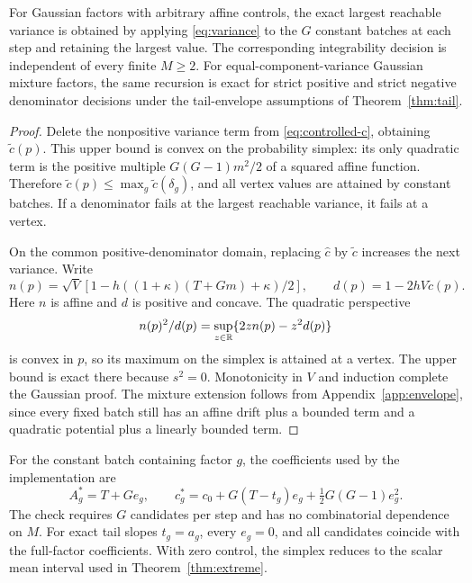 \begin{proposition}\label{prop:control}
For Gaussian factors with arbitrary affine controls, the exact largest reachable variance is obtained by applying \eqref{eq:variance} to the $G$ constant batches at each step and retaining the largest value. The corresponding integrability decision is independent of every finite $M\ge2$. For equal-component-variance Gaussian mixture factors, the same recursion is exact for strict positive and strict negative denominator decisions under the tail-envelope assumptions of Theorem~\ref{thm:tail}.
\end{proposition}
\begin{proof}
Delete the nonpositive variance term from \eqref{eq:controlled-c}, obtaining $\widetilde c(p)$. This upper bound is convex on the probability simplex: its only quadratic term is the positive multiple $G(G-1)m^2/2$ of a squared affine function. Therefore $\widetilde c(p)\le\max_g\widetilde c(\delta_g)$, and all vertex values are attained by constant batches. If a denominator fails at the largest reachable variance, it fails at a vertex.

On the common positive-denominator domain, replacing $\widehat c$ by $\widetilde c$ increases the next variance. Write
\[
 n(p)=\sqrt V[1-h((1+\kappa)(T+Gm)+\kappa)/2],\qquad
 d(p)=1-2hV\widetilde c(p).
\]
Here $n$ is affine and $d$ is positive and concave. The quadratic perspective
\[
 n(p)^2/d(p)=\sup_{z\in\mathbb R}\{2zn(p)-z^2d(p)\}
\]
is convex in $p$, so its maximum on the simplex is attained at a vertex. The upper bound is exact there because $s^2=0$. Monotonicity in $V$ and induction complete the Gaussian proof. The mixture extension follows from Appendix~\ref{app:envelope}, since every fixed batch still has an affine drift plus a bounded term and a quadratic potential plus a linearly bounded term.
\end{proof}

For the constant batch containing factor $g$, the coefficients used by the implementation are
\[
 A_g^*=T+Ge_g,\qquad c_g^*=c_0+G(T-t_g)e_g+\tfrac12G(G-1)e_g^2.
\]
The check requires $G$ candidates per step and has no combinatorial dependence on $M$. For exact tail slopes $t_g=a_g$, every $e_g=0$, and all candidates coincide with the full-factor coefficients. With zero control, the simplex reduces to the scalar mean interval used in Theorem~\ref{thm:extreme}.

